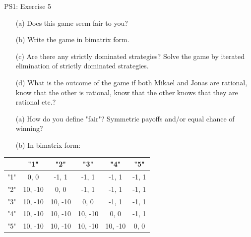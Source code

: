 \begin{frame}{PS1: Exercise 5}
\begin{multicols}{2}
  \begin{itemize}
    \item[(a)] Does this game seem fair to you?
    \item[(b)] Write the game in bimatrix form.
    \item[(c)] Are there any strictly dominated strategies? Solve the game by iterated elimination of strictly dominated strategies.
    \item[(d)] What is the outcome of the game if both Mikael and Jonas are rational, know that the other is rational, know that the other knows that they are rational etc.?
  \end{itemize}
\vfill\null \columnbreak
  \begin{itemize}
    \item[(a)] How do you define "fair"? Symmetric payoffs and/or equal chance of winning?
    \item[(b)] In bimatrix form:
  \end{itemize}
\begin{table}
  \footnotesize
  \begin{tabular}{c|c|c|c|c|c}
        & "1"     & "2"     & "3"     & "4"     & "5"     \\
    \midrule
    "1" & 0, 0    & -1, 1   & -1, 1   & -1, 1   & -1, 1   \\
    \midrule
    "2" & 10, -10 & 0, 0    & -1, 1   & -1, 1   & -1, 1   \\
    \midrule
    "3" & 10, -10 & 10, -10 & 0, 0    & -1, 1   & -1, 1   \\
    \midrule
    "4" & 10, -10 & 10, -10 & 10, -10 & 0, 0    & -1, 1   \\
    \midrule
    "5" & 10, -10 & 10, -10 & 10, -10 & 10, -10 & 0, 0    \\
  \end{tabular}
\end{table}
\end{multicols}
\end{frame}


